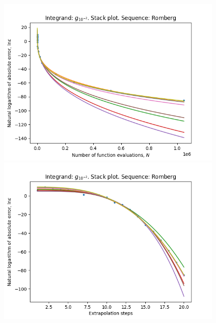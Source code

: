 \begin{figure}[H]
\centering
\begin{minipage}{0.45\textwidth}
\centering
\includegraphics[scale=0.45]{../results/romberg_plots/g_hundredth_hp_romberg_stack.png}
\end{minipage}
\begin{minipage}{0.45\textwidth}
\centering
\includegraphics[scale=0.45]{../results/romberg_plots/g_hundredth_hp_romberg_steps_stack.png}
\end{minipage}
\end{figure}

